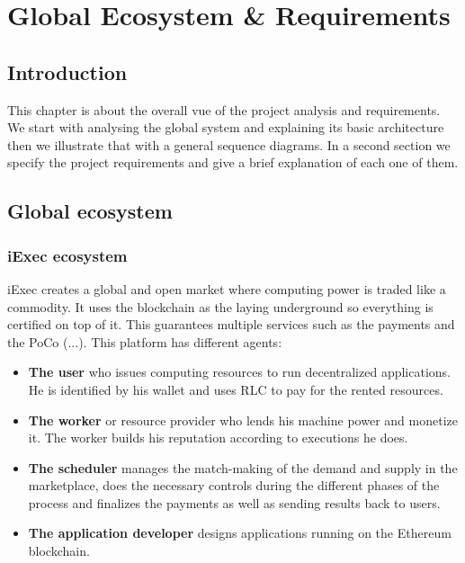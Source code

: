 

\chapter{Global Ecosystem \& Requirements}

\section{Introduction}
    This chapter is about the overall vue of the project analysis and requirements.
    We start with analysing the global system and explaining its basic architecture then we illustrate that with a general
    sequence diagrams. In a second section we specify the project requirements and give a brief explanation of each one of
    them.

\section{Global ecosystem}

    \subsection{iExec ecosystem}
        iExec creates a global and open market where computing power is traded like a commodity. It uses the blockchain
        as the laying underground so everything is certified on top of it. This guarantees multiple services such as
        the payments and the PoCo (...).
        This platform has different agents\cite{iexec-architecture}:
        \begin{itemize}
            \item \textbf{The user} who issues computing resources to run decentralized applications. He is identified by
            his wallet and uses RLC to pay for the rented resources.

            \item \textbf{The worker} or resource provider who lends his machine power and monetize it. The worker builds his
            reputation according to executions he does.
            
            \item \textbf{The scheduler} manages the match-making of the demand and supply in the marketplace, does the
            necessary controls during the different phases of the process and finalizes the payments as well as sending
            results back to users.

            \item \textbf{The application developer} designs applications running on the Ethereum\cite{ethereum} blockchain.
        \end{itemize}

